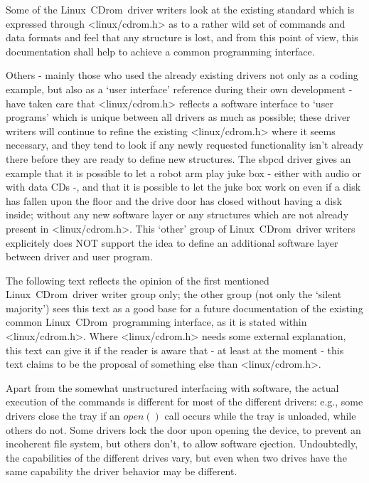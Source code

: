 \documentclass{article}
\def\linux{{\sc Linux}}
\def\cdrom{{\sc CDrom}}
\begin{document}
Some of the \linux\ \cdrom\ driver writers look at the existing standard
which is expressed through <linux/cdrom.h> as to a rather wild set of
commands and data formats and feel that any structure is lost, and from
this point of view, this documentation shall help to achieve a common
programming interface.
 
Others - mainly those who used the already existing drivers not only as
a coding example, but also as a `user interface' reference during their
own development - have taken care that <linux/cdrom.h> reflects a
software interface to `user programs' which is unique between all drivers
as much as possible; these driver writers will continue to refine the
existing <linux/cdrom.h> where it seems necessary, and they tend to look
if any newly requested functionality isn't already there before they are
ready to define new structures. The sbpcd driver gives an example that
it is possible to let a robot arm play juke box - either with audio or
with data CDs -, and that it is possible to let the juke box work on
even if a disk has fallen upon the floor and the drive door has closed 
without having a disk inside; without any new software layer or any
structures which are not already present in <linux/cdrom.h>.
This `other' group of \linux\ \cdrom\ driver writers explicitely does
NOT support the idea to define an additional software layer between driver
and user program.


The following text reflects the opinion of the first mentioned \linux\ 
\cdrom\ driver writer group only; the other group (not only the `silent
majority') sees this text as a good base for a future documentation of the
existing common \linux\ \cdrom\ programming interface, as it is stated 
within <linux/cdrom.h>. Where <linux/cdrom.h> needs some external 
explanation, this text can give it if the reader is aware that - at least
at the moment - this text claims to be the proposal of something else than
<linux/cdrom.h>.


Apart from the somewhat unstructured interfacing with software, the
actual execution of the commands is different for most of the
different drivers: e.g., some drivers close the tray if an $open()$ call
occurs while the tray is unloaded, while others do not. Some drivers lock the
door upon opening the device, to prevent an incoherent file system,
but others don't, to allow software ejection. Undoubtedly, the
capabilities of the different drives vary, but even when two drives have
the same capability the driver behavior may be different. 
\end{document}
